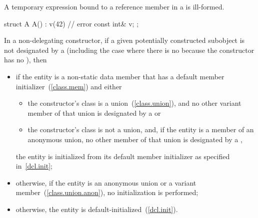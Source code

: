\pnum
A temporary expression bound to a reference member in a 
is ill-formed.
\enterexample
\begin{codeblock}
struct A {
  A() : v(42) { }  // error
  const int& v;
};
\end{codeblock}
\exitexample

\pnum
In a non-delegating constructor, if
a given potentially constructed subobject is not designated by a
(including the case where there is no
because the constructor has no
),
then

\begin{itemize}
\item if the entity is a non-static data member that has
a default member initializer~(\ref{class.mem}) and either

\begin{itemize}
\item the constructor's class is a union~(\ref{class.union}), and no other variant
member of that union is designated by a  or

\item the constructor's class is not a union, and, if the entity is a member of an
anonymous union, no other member of that union is designated by a
,
\end{itemize}

the entity is initialized from its default member initializer
as specified in~\ref{dcl.init};

\item otherwise, if the entity is an anonymous union or a variant member~(\ref{class.union.anon}), no initialization is performed;

\item otherwise, the entity is default-initialized~(\ref{dcl.init}).
\end{itemize}


